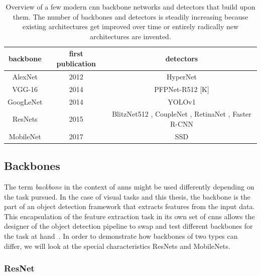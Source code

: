 \documentclass[
			   fontsize=11pt,
               paper=a4,
               bibliography=totoc,
               idxtotoc,
               headsepline,
               footsepline,
               footinclude=false,
               BCOR=12mm,
               DIV=13,
               openany,   %
               ]
               {scrbook}
\begin{document}
\begin{table}[H]
	\begin{tabularx}{\columnwidth}{C | C | C}
		\hline
		backbone					& first publication & detectors \\
		\hline \hline
		AlexNet						  & 2012 \cite{backboneAlexNet}			& HyperNet \cite{detectorHyperNet} \\
		\hline
		VGG-16						 & 2014 \cite{backboneVGG}			   & PFPNet-R512 [K] \\
		\hline
		GoogLeNet			   	   & 2014 \cite{backboneGoogLeNet}			 & YOLOv1 \cite{detectorYOLOv1} \\
		\hline
		ResNets					  	  & 2015 \cite{backboneResNet}		   & BlitzNet512 \cite{detectorBlitzNet}, CoupleNet \cite{detectorCoupleNet}, RetinaNet \cite{detectorRetinaNet},  Faster R-CNN \cite{ren2015faster} \\
		\hline
		MobileNet					 & 2017 \cite{backboneMobileNet}					 & SSD \cite{detectorSSD} \\		
	\end{tabularx}
	\caption[Modern CNN Backbones and Detectors]{Overview of a few modern \gls{cnn} backbone networks and detectors that build upon them. The number of backbones and detectors is steadily increasing because existing architectures get improved over time or entirely radically new architectures are invented.}
	\label{tab:backbonesDetectors}
\end{table}


\subsection{Backbones} \label{ssec:backbones}

The term \textit{backbone} in the context of \glspl{ann} might be used differently depending on the task pursued. In the case of visual tasks and this thesis, the backbone is the part of an object detection framework that extracts features from the input data. This encapsulation of the feature extraction task in its own set of \glspl{cnn} allows the designer of the object detection pipeline to swap and test different backbones for the task at hand~\cite{backbones}. In order to demonstrate how backbones of two types can differ, we will look at the special characteristics ResNets and MobileNets.

\subsubsection{ResNet}
\end{document}

